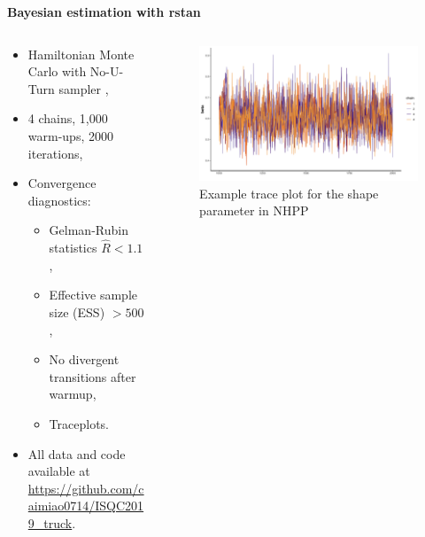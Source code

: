 \documentclass[aspectratio=43]{beamer}
\begin{document}
\begin{frame}{\textbf{Bayesian estimation with rstan}}
\begin{columns}
\begin{column}{.65\textwidth}
\begin{itemize}
    \item Hamiltonian Monte Carlo with No-U-Turn sampler \cite{hoffman2014no, carpenter2017stan},
    \item 4 chains, 1,000 warm-ups, 2000 iterations,
    \item Convergence diagnostics:
    \begin{itemize}
        \item Gelman-Rubin statistics $\hat{R} < 1.1$ \cite{gelman1992inference},
        \item Effective sample size (ESS) $> 500$,
        \item No divergent transitions after warmup,
        \item Traceplots.
    \end{itemize}
    \item All data and code available at \href{https://github.com/caimiao0714/ISQC2019_truck}{https://github.com/caimiao0714/ISQC2019_truck}.
\end{itemize}
\end{column}
\hfill
\begin{column}{.35\textwidth}
\begin{figure}
  \includegraphics[width=\textwidth]{Figures/traceplot_beta.png}
  \caption{Example trace plot for the shape parameter in NHPP}
\end{figure}
\end{column}
\end{columns}
\end{frame}
\end{document}
